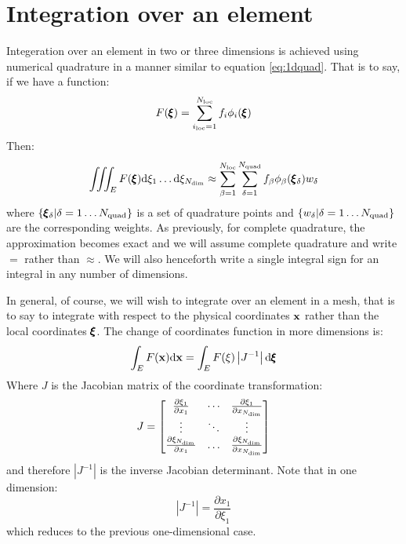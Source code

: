 \documentclass[a4paper, 11pt]{book}
\begin{document}
\section{Integration over an element}\label{sec:quadrature}

Integeration over an element in two or three dimensions is achieved using
numerical quadrature in a manner similar to equation \eqref{eq:1dquad}. That
is to say, if we have a function:
\begin{equation}
  F(\pmb{\xi})=\sum_{{i_\mathrm{loc}}=1}^{N_\mathrm{loc}}f_i\phi_i(\pmb{\xi})
\end{equation}
Then:
\begin{equation}
  \iiint_E F(\pmb{\xi})\mathrm{d}\xi_1\ldots\mathrm{d}\xi_{N_\mathrm{dim}}
  \approx \sum_{\beta=1}^{N_\mathrm{loc}}\sum_{\delta=1}^{N_\mathrm{quad}} f_\beta\phi_\beta(\pmb{\xi}_\delta)w_\delta
\end{equation}
where $\{\pmb{\xi}_\delta|\delta=1\ldots N_\mathrm{quad}\}$ is a set of quadrature points
and $\{w_\delta|\delta=1\ldots N_\mathrm{quad}\}$ are the corresponding weights. As
previously, for complete quadrature, the approximation becomes exact and we
will assume complete quadrature and write $=$ rather than $\approx$. We will
also henceforth write a single integral sign for an integral in any number
of dimensions.

In general, of course, we will wish to integrate over an element in a mesh,
that is to say to integrate with respect to the physical coordinates $\mathbf{x}$
rather than the local coordinates $\pmb{\xi}$. The change of coordinates
function in more dimensions is:
\begin{equation}
  \int_E F(\mathbf{x}) \mathrm{d}\mathbf{x} = \int_E F(\xi) \left|J^{-1}\right|\mathrm{d}\pmb{\xi}
\end{equation}
Where $J$ is the Jacobian matrix of the coordinate transformation:
\begin{equation}
  J=
  \begin{bmatrix}
    \frac{\partial\xi_1}{\partial x_1} & \cdots &
    \frac{\partial\xi_1}{\partial x_{N_\mathrm{dim}}}\\
    \vdots & \ddots & \vdots\\
    \frac{\partial\xi_{N_\mathrm{dim}}}{\partial x_1} & \ldots & \frac{\partial\xi_{N_\mathrm{dim}}}{\partial x_{N_\mathrm{dim}}}
  \end{bmatrix}
\end{equation}
and therefore $\left|J^{-1}\right|$ is the inverse Jacobian
determinant. Note that in one dimension:
\begin{equation}
  \left|J^{-1}\right|=\frac{\partial x_1}{\partial\xi_1}
\end{equation}
which reduces to the previous one-dimensional case.
\end{document}
